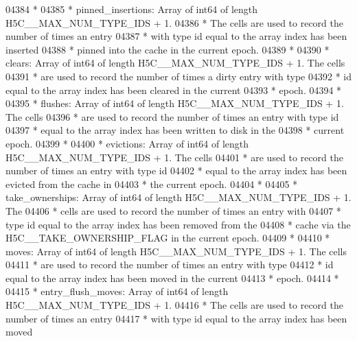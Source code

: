 \begin{DoxyCode}
04384 \textcolor{comment}{ *}
04385 \textcolor{comment}{ * pinned\_insertions:  Array of int64 of length H5C\_\_MAX\_NUM\_TYPE\_IDS + 1. }
04386 \textcolor{comment}{ *      The cells are used to record the number of times an entry}
04387 \textcolor{comment}{ *      with type id equal to the array index has been inserted}
04388 \textcolor{comment}{ *      pinned into the cache in the current epoch.}
04389 \textcolor{comment}{ *}
04390 \textcolor{comment}{ * clears:      Array of int64 of length H5C\_\_MAX\_NUM\_TYPE\_IDS + 1.  The cells}
04391 \textcolor{comment}{ *      are used to record the number of times a dirty entry with type}
04392 \textcolor{comment}{ *      id equal to the array index has been cleared in the current}
04393 \textcolor{comment}{ *      epoch.}
04394 \textcolor{comment}{ *}
04395 \textcolor{comment}{ * flushes:     Array of int64 of length H5C\_\_MAX\_NUM\_TYPE\_IDS + 1.  The cells}
04396 \textcolor{comment}{ *      are used to record the number of times an entry with type id}
04397 \textcolor{comment}{ *      equal to the array index has been written to disk in the}
04398 \textcolor{comment}{ *              current epoch.}
04399 \textcolor{comment}{ *}
04400 \textcolor{comment}{ * evictions:   Array of int64 of length H5C\_\_MAX\_NUM\_TYPE\_IDS + 1.  The cells}
04401 \textcolor{comment}{ *      are used to record the number of times an entry with type id}
04402 \textcolor{comment}{ *      equal to the array index has been evicted from the cache in}
04403 \textcolor{comment}{ *      the current epoch.}
04404 \textcolor{comment}{ *}
04405 \textcolor{comment}{ * take\_ownerships: Array of int64 of length H5C\_\_MAX\_NUM\_TYPE\_IDS + 1.  The }
04406 \textcolor{comment}{ *      cells are used to record the number of times an entry with }
04407 \textcolor{comment}{ *      type id equal to the array index has been removed from the }
04408 \textcolor{comment}{ *      cache via the H5C\_\_TAKE\_OWNERSHIP\_FLAG in the current epoch.}
04409 \textcolor{comment}{ *}
04410 \textcolor{comment}{ * moves:       Array of int64 of length H5C\_\_MAX\_NUM\_TYPE\_IDS + 1.  The cells}
04411 \textcolor{comment}{ *      are used to record the number of times an entry with type}
04412 \textcolor{comment}{ *      id equal to the array index has been moved in the current}
04413 \textcolor{comment}{ *      epoch.}
04414 \textcolor{comment}{ *}
04415 \textcolor{comment}{ * entry\_flush\_moves: Array of int64 of length H5C\_\_MAX\_NUM\_TYPE\_IDS + 1. }
04416 \textcolor{comment}{ *      The cells are used to record the number of times an entry}
04417 \textcolor{comment}{ *      with type id equal to the array index has been moved}

\end{DoxyCode}
